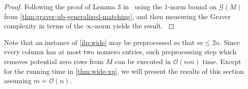 \documentclass[a4paper,UKenglish,cleveref,thm-restate]{lipics-v2021}
\renewcommand{\O}{\mathcal O}
\newcommand{\G}{\mathcal G}
\begin{document}
\begin{proof}
    Following the proof of Lemma 3 in~\cite{DBLP:conf/icalp/EisenbrandHK18} using the $1$-norm bound on $\G(M)$ from \cref{thm:graver-ub-generalized-matching}, and then measuring the Graver complexity in terms of the $\infty$-norm yields the result.
    \label{lemma:graver-lower-bound-wide}
\end{proof}

Note that an instance of \cref{ilp:wide} may be preprocessed so that $m\le2n$. Since every column has at most two nonzero entries, such preprocessing step which removes potential zero rows from $M$ can be executed in $\O(nm)$ time. Except for the running time in \cref{thm:wide-xp}, we will present the results of this section assuming $m=\O(n)$.

\iftoggle{ea}{

}{

As shown in \cref{prop:graver-lb-wide}, the bound from \cref{cor:graver-ub-wide} is asymptotically tight for constant $h$.

\propgraverlbwide*

}
\end{document}
